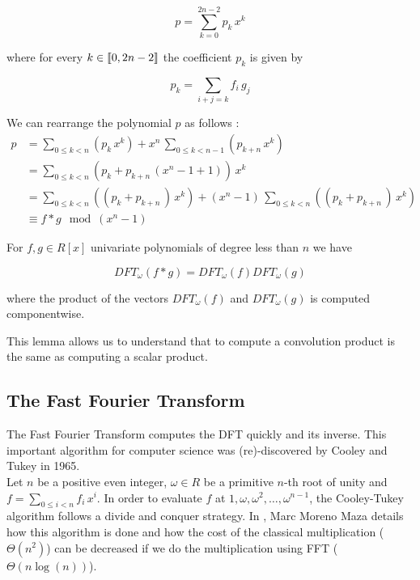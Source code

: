 $$p = \sum_{k=0}^{2n-2} p_k\,x^k$$

where for every $k \in \mbox{\textlbrackdbl} 0, 2n-2\mbox{\textrbrackdbl}$ the coefficient $p_k$ is given by

$$p_k = \sum_{i+j=k}f_i\,g_j$$

We can rearrange the polynomial $p$ as follows : \\

\begin{align*}
p &= \sum_{0\leq k < n} \left( p_k\,x^k \right) + x^n \, \sum_{0\leq k <n-1} \left( p_{k+n}\,x^k \right) \\
  &= \sum_{0\leq k < n} \left( p_k + p_{k+n}\, (x^n-1+1) \right) \, x^k \\
  &= \sum_{0\leq k < n} \left(\left( p_k + p_{k+n}\, \right) \, x^k \right) + (x^n-1)\, \sum_{0\leq k < n} \left(\left( p_k + p_{k+n}\, \right) \, x^k\right) \\
  &\equiv f * g \mod \left(x^n-1\right) 
\end{align*}


\begin{lemma*}
For $f,g \in R[x]$ univariate polynomials of degree less than $n$ we have 

$$ DFT_{\omega}(f * g) = DFT_{\omega}(f)DFT_{\omega}(g)$$

where the product of the vectors $DFT_{\omega}(f)$ and $DFT_{\omega}(g)$ is computed componentwise.
\end{lemma*}

This lemma allows us to understand that to compute a convolution product is the same as computing a scalar product.


\subsection{The Fast Fourier Transform}

The Fast Fourier Transform computes the DFT quickly and its inverse. This important algorithm for computer science was (re)-discovered by Cooley and Tukey in 1965.\\
Let $n$ be a positive even integer, $\omega \in R$ be a primitive $n$-th root of unity and $f = \sum_{0\leq i<n} f_i\,x^i$. In order to evaluate $f$ at $1, \omega, \omega^{2}, \dots, \omega^{n-1}$, the Cooley-Tukey algorithm follows a divide and conquer strategy. In \cite{FastMulMMM}, Marc Moreno Maza details how this algorithm is done and how the cost of the classical multiplication ($\Theta(n^2)$) can be decreased if we do the multiplication using FFT ($\Theta(n\log(n))$). \\

